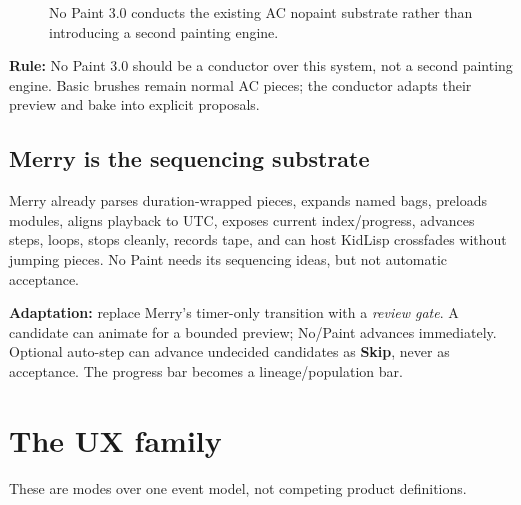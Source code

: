 \documentclass[10pt,letterpaper,twocolumn]{article}
\begin{document}
\begin{figure}[t]
\centering
{}
\caption{No Paint 3.0 conducts the existing AC nopaint substrate rather than introducing a second painting engine.}
\end{figure}

\textbf{Rule:} No Paint 3.0 should be a conductor over this system, not a second painting engine. Basic brushes remain normal AC pieces; the conductor adapts their preview and bake into explicit proposals.

\subsection{Merry is the sequencing substrate}

Merry already parses duration-wrapped pieces, expands named bags, preloads modules, aligns playback to UTC, exposes current index/progress, advances steps, loops, stops cleanly, records tape, and can host KidLisp crossfades without jumping pieces. No Paint needs its sequencing ideas, but not automatic acceptance.

\begin{plain}
\textbf{Adaptation:} replace Merry's timer-only transition with a \emph{review gate}. A candidate can animate for a bounded preview; No/Paint advances immediately. Optional auto-step can advance undecided candidates as \textbf{Skip}, never as acceptance. The progress bar becomes a lineage/population bar.
\end{plain}

\section{The UX family}

These are modes over one event model, not competing product definitions.
\end{document}
